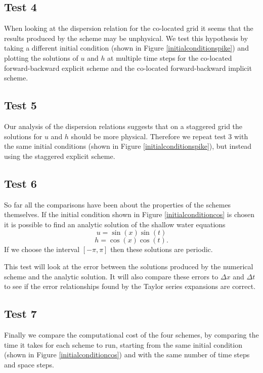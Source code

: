 \documentclass[a4paper,12pt, notitlepage]{article}
\begin{document}
\subsection{Test 4}
When looking at the dispersion relation for the co-located grid it seems that the results produced by the scheme may be unphysical. We test this hypothesis by taking a different initial condition (shown in Figure \ref{initialconditionspike}) and plotting the solutions of $u$ and $h$ at multiple time steps for the co-located forward-backward explicit scheme and the co-located forward-backward implicit scheme.

\subsection{Test 5}
Our analysis of the dispersion relations suggests that on a staggered grid the solutions for $u$ and $h$ should be more physical. Therefore we repeat test 3 with the same initial conditions (shown in Figure \ref{initialconditionspike}), but instead using the staggered explicit scheme.

\subsection{Test 6}
So far all the comparisons have been about the properties of the schemes themselves. If the initial condition shown in Figure \ref{initialconditioncos} is chosen it is possible to find an analytic solution of the shallow water equations
\begin{equation}
u = \sin(x)\sin(t)
\end{equation}
\begin{equation}
h = \cos(x)\cos(t).
\end{equation}
If we choose the interval $[-\pi, \pi]$ then these solutions are periodic.

This test will look at the error between the solutions produced by the numerical scheme and the analytic solution. It will also compare these errors to $\Delta x$ and $\Delta t$ to see if the error relationships found by the Taylor series expansions are correct.

\subsection{Test 7}
Finally we compare the computational cost of the four schemes, by comparing the time it takes for each scheme to run, starting from the same initial condition (shown in Figure \ref{initialconditioncos}) and with the same number of time steps and space steps.
\end{document}
